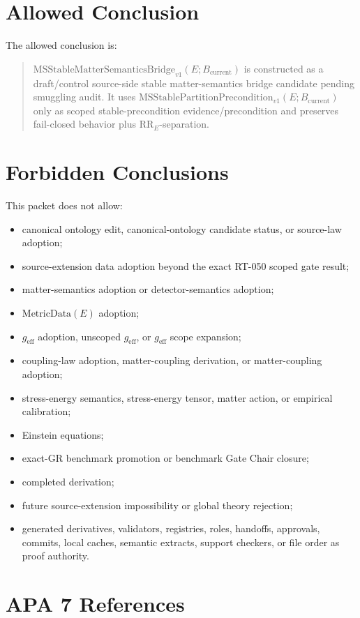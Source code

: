 \documentclass[11pt]{article}
\newcommand{\Bcur}{B_{\mathrm{current}}}
\newcommand{\MSStablePre}{\mathrm{MSStablePartitionPrecondition}_{v1}}
\newcommand{\MSBridge}{\mathrm{MSStableMatterSemanticsBridge}_{v1}}
\newcommand{\MetricData}{\mathrm{MetricData}}
\newcommand{\geff}{g_{\mathrm{eff}}}
\begin{document}
\section{Allowed Conclusion}

The allowed conclusion is:
\begin{quote}
\(\MSBridge(E;\Bcur)\) is constructed as a draft/control source-side stable
matter-semantics bridge candidate pending smuggling audit. It uses
\(\MSStablePre(E;\Bcur)\) only as scoped stable-precondition
evidence/precondition and preserves fail-closed behavior plus
\(\mathrm{RR}_E\)-separation.
\end{quote}

\section{Forbidden Conclusions}

This packet does not allow:
\begin{itemize}[leftmargin=*]
  \item canonical ontology edit, canonical-ontology candidate status, or
    source-law adoption;
  \item source-extension data adoption beyond the exact RT-050 scoped gate
    result;
  \item matter-semantics adoption or detector-semantics adoption;
  \item \(\MetricData(E)\) adoption;
  \item \(\geff\) adoption, unscoped \(\geff\), or \(\geff\) scope expansion;
  \item coupling-law adoption, matter-coupling derivation, or
    matter-coupling adoption;
  \item stress-energy semantics, stress-energy tensor, matter action, or
    empirical calibration;
  \item Einstein equations;
  \item exact-GR benchmark promotion or benchmark Gate Chair closure;
  \item completed derivation;
  \item future source-extension impossibility or global theory rejection;
  \item generated derivatives, validators, registries, roles, handoffs,
    approvals, commits, local caches, semantic extracts, support checkers, or
    file order as proof authority.
\end{itemize}

\section{APA 7 References}
\end{document}
